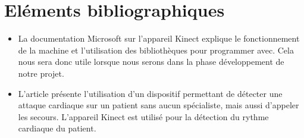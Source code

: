 \documentclass[12pt,a4paper]{article}
\begin{document}
\part{Eléments bibliographiques}
\begin{itemize}

\item La documentation \cite{Kinect} Microsoft sur l'appareil Kinect explique le fonctionnement de la machine et l'utilisation des bibliothèques pour programmer avec. Cela nous sera donc utile lorsque nous serons dans la phase développement de notre projet.
\newline
\item L'article \cite{Patel14} présente l'utilisation d'un dispositif permettant de détecter une attaque cardiaque sur un patient sans aucun spécialiste, mais aussi d'appeler les secours. L'appareil Kinect est utilisé pour la détection du rythme cardiaque du patient.
\newline


\end{itemize}
\end{document}
